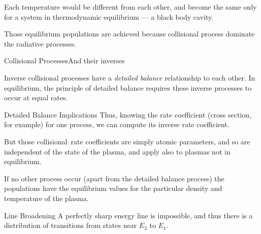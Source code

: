 \documentclass[draft]{beamer}
\begin{document}
\begin{frame}{\lte}
  \begin{center}
\end{center}
Each temperature would be different from each other, and become the same only for a system in thermodynamic equilibrium --- a black body cavity.

Those equilibrium populations are achieved because collisional process dominate the radiative processes.
\end{frame}
\begin{frame}{Collisional Processes}{And their inverses}
  \begin{center}
\end{center}
Inverse collisional processes have a \emph{detailed balance} relationship to each other.
In equilibrium, the principle of detailed balance requires these inverse processes to occur at equal rates.

\end{frame}
\begin{frame}{Detailed Balance Implications}
Thus, knowing the rate coefficient (cross section, for example) for one process, we can compute its inverse rate coefficient.

But those collisional--rate coefficients are simply atomic parameters\footnotemark, and so are independent of the state of the plasma, and apply also to plasmas not in equilibrium.

If no other process occur (apart from the detailed balance process) the populations have the equilibrium values for the particular density and temperature of the plasma.
\end{frame}
\begin{frame}{Line Broadening}
A perfectly sharp energy line is impossible, and thus there is a distribution of transitions from states near $E_2$ to $E_1$.
\end{frame}
\end{document}
